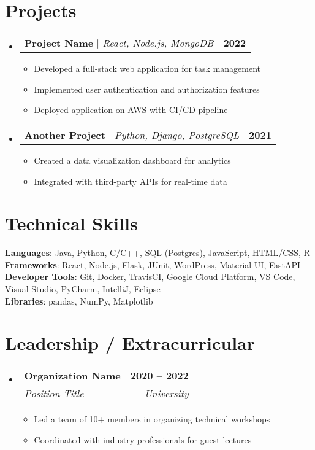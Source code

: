 \documentclass[letterpaper,11pt]{article}
\makeatletter
\newcommand{\resumeItem}[1]{
  \item\small{
    {#1 \vspace{-2pt}}
  }
}
\newcommand{\resumeSubheading}[4]{
  \vspace{-2pt}\item
    \begin{tabular*}{1.0\textwidth}[t]{l@{\extracolsep{\fill}}r}
      \textbf{#1} & \textbf{\small #2} \\
      \textit{\small#3} & \textit{\small #4} \\
    \end{tabular*}\vspace{-7pt}
}
\newcommand{\resumeProjectHeading}[2]{
    \item
    \begin{tabular*}{1.001\textwidth}{l@{\extracolsep{\fill}}r}
      \small#1 & \textbf{\small #2}\\
    \end{tabular*}\vspace{-7pt}
}
\newcommand{\resumeSubHeadingListStart}{\begin{itemize}[leftmargin=0.0in, label={}]}
\newcommand{\resumeSubHeadingListEnd}{\end{itemize}}
\newcommand{\resumeItemListStart}{\begin{itemize}}
\newcommand{\resumeItemListEnd}{\end{itemize}\vspace{-5pt}}
\makeatother
\begin{document}
\section{Projects}
    \vspace{-5pt}
    \resumeSubHeadingListStart
      \resumeProjectHeading
          {\textbf{Project Name} $|$ \emph{React, Node.js, MongoDB}}{2022}
          \resumeItemListStart
            \resumeItem{Developed a full-stack web application for task management}
            \resumeItem{Implemented user authentication and authorization features}
            \resumeItem{Deployed application on AWS with CI/CD pipeline}
          \resumeItemListEnd
          \vspace{-13pt}
      \resumeProjectHeading
          {\textbf{Another Project} $|$ \emph{Python, Django, PostgreSQL}}{2021}
          \resumeItemListStart
            \resumeItem{Created a data visualization dashboard for analytics}
            \resumeItem{Integrated with third-party APIs for real-time data}
          \resumeItemListEnd 
    \resumeSubHeadingListEnd
\vspace{-15pt}

\section{Technical Skills}
 \begin{itemize}[leftmargin=0.15in, label={}]
    \small{\item{
     \textbf{Languages}{: Java, Python, C/C++, SQL (Postgres), JavaScript, HTML/CSS, R} \\
     \textbf{Frameworks}{: React, Node.js, Flask, JUnit, WordPress, Material-UI, FastAPI} \\
     \textbf{Developer Tools}{: Git, Docker, TravisCI, Google Cloud Platform, VS Code, Visual Studio, PyCharm, IntelliJ, Eclipse} \\
     \textbf{Libraries}{: pandas, NumPy, Matplotlib}
    }}
 \end{itemize}
 \vspace{-16pt}

\section{Leadership / Extracurricular}
    \resumeSubHeadingListStart
        \resumeSubheading{Organization Name}{2020 -- 2022}{Position Title}{University}
            \resumeItemListStart
                \resumeItem{Led a team of 10+ members in organizing technical workshops}
                \resumeItem{Coordinated with industry professionals for guest lectures}
            \resumeItemListEnd
        
    \resumeSubHeadingListEnd
\end{document}
